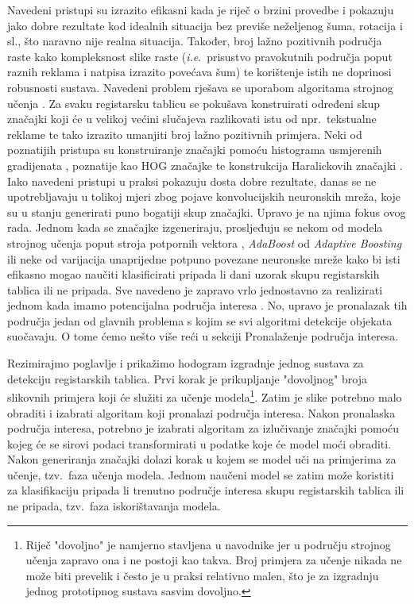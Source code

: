 \documentclass[times, utf8, diplomski]{fer}
\begin{document}
Navedeni pristupi su izrazito efikasni kada je riječ o brzini provedbe i pokazuju jako dobre rezultate kod idealnih situacija bez previše neželjenog šuma, rotacija i sl., što naravno nije realna situacija. Također, broj lažno pozitivnih  područja raste kako kompleksnost slike raste (\textit{i.e}.\ prisustvo pravokutnih područja poput raznih reklama i natpisa izrazito povećava šum) te korištenje istih ne doprinosi robusnosti sustava. Navedeni problem rješava se uporabom algoritama strojnog učenja . Za svaku registarsku tablicu se pokušava konstruirati određeni skup značajki koji će u velikoj većini slučajeva razlikovati istu od npr.\ tekstualne reklame te tako izrazito umanjiti broj lažno pozitivnih primjera. Neki od poznatijih pristupa su konstruiranje značajki pomoću histograma usmjerenih gradijenata  \citep{hog-paper}, poznatije kao HOG značajke te konstrukcija Haralickovih značajki  \citep{haar-paper}. Iako navedeni pristupi u praksi pokazuju dosta dobre rezultate, danas se ne upotrebljavaju u tolikoj mjeri zbog pojave konvolucijskih neuronskih mreža, koje su u stanju generirati puno bogatiji skup značajki. Upravo je na njima fokus ovog rada. Jednom kada se značajke izgeneriraju, prosljeđuju se nekom od modela strojnog učenja poput stroja potpornih vektora , \textit{AdaBoost} od \textit{Adaptive Boosting} ili neke od varijacija unaprijedne potpuno povezane neuronske mreže kako bi isti efikasno mogao naučiti klasificirati pripada li dani uzorak skupu registarskih tablica ili ne pripada. Sve navedeno je zapravo vrlo jednostavno za realizirati jednom kada imamo potencijalna područja interesa . No, upravo je pronalazak tih područja jedan od glavnih problema s kojim se svi algoritmi detekcije objekata suočavaju. O tome ćemo nešto više reći u sekciji Pronalaženje područja interesa.

\bigskip

Rezimirajmo poglavlje i prikažimo hodogram izgradnje jednog sustava za detekciju registarskih tablica. Prvi korak je prikupljanje "dovoljnog" broja slikovnih primjera koji će služiti za učenje modela\footnote{Riječ "dovoljno" je namjerno stavljena u navodnike jer u području strojnog učenja zapravo ona i ne postoji kao takva. Broj primjera za učenje nikada ne može biti prevelik i često je u praksi relativno malen, što je za izgradnju jednog prototipnog sustava sasvim dovoljno.}. Zatim je slike potrebno malo obraditi i izabrati algoritam koji pronalazi područja interesa. Nakon pronalaska područja interesa, potrebno je izabrati algoritam za izlučivanje značajki  pomoću kojeg će se sirovi podaci transformirati u podatke koje će model moći obraditi. Nakon generiranja značajki dolazi korak u kojem se model uči na primjerima za učenje, tzv.\ faza učenja modela. Jednom naučeni model se zatim može koristiti za klasifikaciju pripada li trenutno područje interesa skupu registarskih tablica ili ne pripada, tzv.\ faza iskorištavanja modela.
\end{document}
